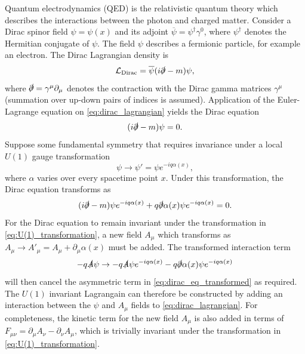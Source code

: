 Quantum electrodynamics (QED) is the relativistic quantum theory which describes the interactions between the photon and charged matter.
Consider a Dirac spinor field $\psi = \psi(x)$ and its adjoint $\overline{\psi} = \psi^\dagger \gamma^0$, where $\psi^\dagger$ denotes the Hermitian conjugate of $\psi$.
The field $\psi$ describes a fermionic \spinhalf particle, for example an electron.
The Dirac Lagrangian density is
%
\begin{equation}\label{eq:dirac_lagrangian}
  \mathcal{L}_{\textnormal{Dirac}} = \overline{\psi} (i \slashed{\partial}  - m )\psi,
\end{equation}
%
where $\slashed{\partial} = \gamma^\mu \partial_\mu$ denotes the contraction with the Dirac gamma matrices $\gamma^\mu$ (summation over up-down pairs of indices is assumed).
Application of the Euler-Lagrange equation on \cref{eq:dirac_lagrangian} yields the Dirac equation
%
\begin{equation}\label{eq:dirac_eq}
  (i \slashed{\partial}  - m )\psi = 0 .
\end{equation}
%
Suppose some fundamental symmetry that requires invariance under a local $U(1)$ gauge transformation
%
\begin{equation}\label{eq:U(1)_transformation}
  \psi \rightarrow \psi' = \psi e^{- i q \alpha(x)} ,
\end{equation}
%
where $\alpha$ varies over every spacetime point $x$.
Under this transformation, the Dirac equation transforms as 
%
\begin{equation}\label{eq:dirac_eq_transformed}
  (i \slashed{\partial} - m ) \psi e^{- i q \alpha(x)} + q \slashed{\partial}\alpha(x) \psi e^{- i q \alpha(x)} = 0.
\end{equation}
%
For the Dirac equation to remain invariant under the transformation in \cref{eq:U(1)_transformation}, a new field $A_\mu$ which transforms as $A_\mu \rightarrow A'_\mu = A_\mu + \partial_\mu \alpha(x)$ must be added.
The transformed interaction term
%
\begin{equation}
  - q \slashed{A} \psi \rightarrow - q \slashed{A} \psi e^{- i q \alpha(x)} - q \slashed{\partial} \alpha(x) \psi e^{- i q \alpha(x)}
\end{equation}
%
will then cancel the asymmetric term in \cref{eq:dirac_eq_transformed} as required.
The $U(1)$ invariant Lagrangain can therefore be constructed by adding an interaction between the $\psi$ and $A_\mu$ fields to \cref{eq:dirac_lagrangian}. For completeness, the kinetic term for the new field $A_\mu$ is also added in terms of $F_{\mu\nu} = \partial_\mu A_\nu - \partial_\nu A_\mu$, which is trivially invariant under the transformation in \cref{eq:U(1)_transformation}.
